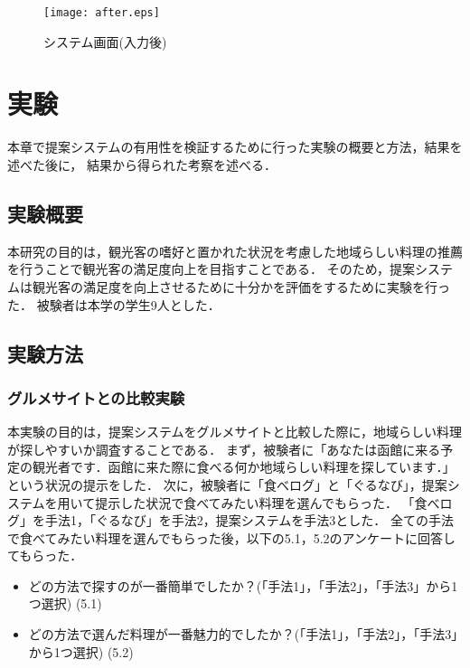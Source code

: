 \documentclass{funthesis}
\begin{document}
\newpage

\begin{figure}[tbp]
  \begin{center}
    \texttt{[image: after.eps]}
    \caption{システム画面(入力後)}
  \end{center}
\end{figure}

\chapter{実験}
本章で提案システムの有用性を検証するために行った実験の概要と方法，結果を述べた後に，
結果から得られた考察を述べる．

\section{実験概要}
本研究の目的は，観光客の嗜好と置かれた状況を考慮した地域らしい料理の推薦を行うことで観光客の満足度向上を目指すことである．
そのため，提案システムは観光客の満足度を向上させるために十分かを評価をするために実験を行った．
被験者は本学の学生9人とした．

\section{実験方法}
\subsection{グルメサイトとの比較実験}
本実験の目的は，提案システムをグルメサイトと比較した際に，地域らしい料理が探しやすいか調査することである．
まず，被験者に「あなたは函館に来る予定の観光者です．函館に来た際に食べる何か地域らしい料理を探しています．」という状況の提示をした．
次に，被験者に「食べログ」と「ぐるなび」，提案システムを用いて提示した状況で食べてみたい料理を選んでもらった．
「食べログ」を手法1，「ぐるなび」を手法2，提案システムを手法3とした．
全ての手法で食べてみたい料理を選んでもらった後，以下の5.1，5.2のアンケートに回答してもらった．

\begin{itemize}
 \item どの方法で探すのが一番簡単でしたか？(「手法1」，「手法2」，「手法3」から1つ選択)   (5.1)
 \item どの方法で選んだ料理が一番魅力的でしたか？(「手法1」，「手法2」，「手法3」から1つ選択)   (5.2)
\end{itemize}
\end{document}
